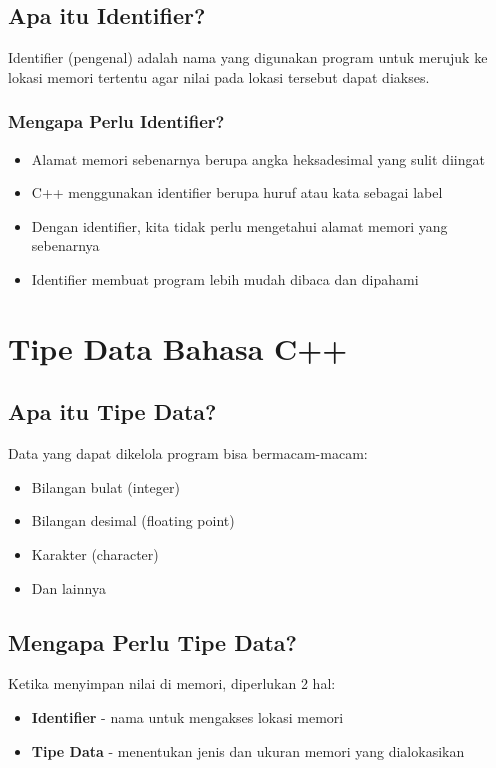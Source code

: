 \subsection{Apa itu Identifier?}

Identifier (pengenal) adalah nama yang digunakan program untuk merujuk ke lokasi memori tertentu agar nilai pada lokasi tersebut dapat diakses.

\subsubsection{Mengapa Perlu Identifier?}

\begin{itemize}
\item Alamat memori sebenarnya berupa angka heksadesimal yang sulit diingat
\item C++ menggunakan identifier berupa huruf atau kata sebagai label
\item Dengan identifier, kita tidak perlu mengetahui alamat memori yang sebenarnya
\item Identifier membuat program lebih mudah dibaca dan dipahami
\end{itemize}

\section{Tipe Data Bahasa C++}\label{tipe-data-bahasa-c}

\subsection{Apa itu Tipe Data?}

Data yang dapat dikelola program bisa bermacam-macam:
\begin{itemize}
\item Bilangan bulat (integer)
\item Bilangan desimal (floating point)
\item Karakter (character)
\item Dan lainnya
\end{itemize}

\subsection{Mengapa Perlu Tipe Data?}

Ketika menyimpan nilai di memori, diperlukan 2 hal:
\begin{itemize}
\item \textbf{Identifier} - nama untuk mengakses lokasi memori
\item \textbf{Tipe Data} - menentukan jenis dan ukuran memori yang dialokasikan
\end{itemize}

